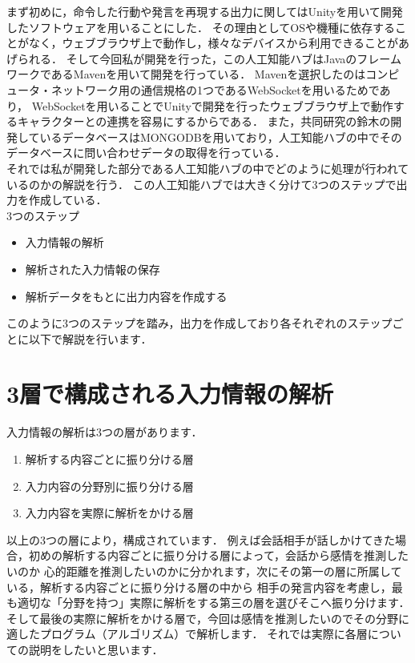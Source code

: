 
まず初めに，命令した行動や発言を再現する出力に関してはUnityを用いて開発したソフトウェアを用いることにした．
その理由としてOSや機種に依存することがなく，ウェブブラウザ上で動作し，様々なデバイスから利用できることがあげられる．
そして今回私が開発を行った，この人工知能ハブはJavaのフレームワークであるMavenを用いて開発を行っている．
Mavenを選択したのはコンピュータ・ネットワーク用の通信規格の1つであるWebSocketを用いるためであり，
WebSocketを用いることでUnityで開発を行ったウェブブラウザ上で動作するキャラクターとの連携を容易にするからである．
また，共同研究の鈴木の開発しているデータベースはMONGODBを用いており，人工知能ハブの中でそのデータベースに問い合わせデータの取得を行っている．
\\
それでは私が開発した部分である人工知能ハブの中でどのように処理が行われているのかの解説を行う．
この人工知能ハブでは大きく分けて3つのステップで出力を作成している．\\

3つのステップ
\begin{itemize}
	\item{入力情報の解析}
	\item{解析された入力情報の保存}
	\item{解析データをもとに出力内容を作成する}
\end{itemize}
このように3つのステップを踏み，出力を作成しており各それぞれのステップごとに以下で解説を行います．

\section{3層で構成される入力情報の解析}
入力情報の解析は3つの層があります．
\begin{enumerate}
	\item{解析する内容ごとに振り分ける層}
	\item{入力内容の分野別に振り分ける層}
	\item{入力内容を実際に解析をかける層}
\end{enumerate}
以上の3つの層により，構成されています．
例えば会話相手が話しかけてきた場合，初めの解析する内容ごとに振り分ける層によって，会話から感情を推測したいのか
心的距離を推測したいのかに分かれます，次にその第一の層に所属している，解析する内容ごとに振り分ける層の中から
相手の発言内容を考慮し，最も適切な「分野を持つ」実際に解析をする第三の層を選びそこへ振り分けます．
そして最後の実際に解析をかける層で，今回は感情を推測したいのでその分野に適したプログラム（アルゴリズム）で解析します．
それでは実際に各層についての説明をしたいと思います．\\

